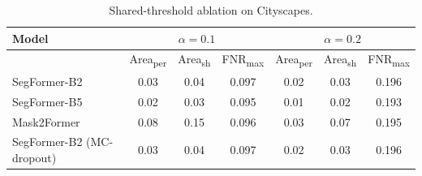 \begin{table}[t]
\centering
\scriptsize
\setlength{\tabcolsep}{2.5pt}
\begin{tabular}{lcccccc}
\toprule
Model & \multicolumn{3}{c}{$\alpha=0.1$} & \multicolumn{3}{c}{$\alpha=0.2$} \\
\midrule
 & Area\textsubscript{per} & Area\textsubscript{sh} & FNR\textsubscript{max} & Area\textsubscript{per} & Area\textsubscript{sh} & FNR\textsubscript{max} \\
\midrule
SegFormer-B2 & 0.03 & 0.04 & 0.097 & 0.02 & 0.03 & 0.196 \\
SegFormer-B5 & 0.02 & 0.03 & 0.095 & 0.01 & 0.02 & 0.193 \\
Mask2Former & 0.08 & 0.15 & 0.096 & 0.03 & 0.07 & 0.195 \\
SegFormer-B2 (MC-dropout) & 0.03 & 0.04 & 0.097 & 0.02 & 0.03 & 0.196 \\
\bottomrule
\end{tabular}
\caption{Shared-threshold ablation on Cityscapes.}
\label{tab:ablations}
\end{table}
